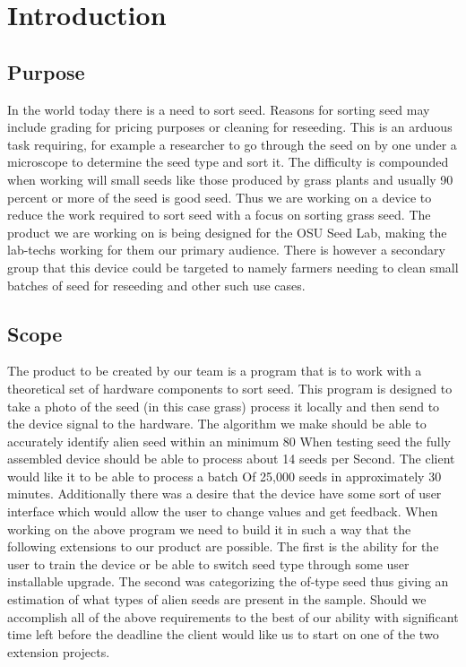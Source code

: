 \documentclass[onecolumn, draftclsnofoot,10pt, compsoc]{IEEEtran}
\begin{document}

\section{Introduction}

\subsection{Purpose}
In the world today there is a need to sort seed.
Reasons for sorting seed may include grading for pricing purposes or cleaning for reseeding.
This is an arduous task requiring, for example a researcher to go through the seed on by one under a microscope to determine the seed type and sort it.
The difficulty is compounded when working will small seeds like those produced by grass plants and usually 90 percent or more of the seed is good seed.
Thus we are working on a device to reduce the work required to sort seed with a focus on sorting grass seed.
The product we are working on is being designed for the OSU Seed Lab, making the lab-techs working for them our primary audience.
There is however a secondary group that this device could be targeted to namely farmers needing to clean small batches of seed for reseeding and other such use cases.

\subsection{Scope}
The product to be created by our team is a program that is to work with a theoretical set of hardware components to sort seed.
This program is designed to take a photo of the seed (in this case grass) process it locally and then send to the device signal to the hardware.
The algorithm we make should be able to accurately identify alien seed within an minimum 80%
When testing seed the fully assembled device should be able to process about 14 seeds per Second.
The client would like it to be able to process a batch Of 25,000 seeds in approximately 30 minutes.
Additionally there was a desire that the device have some sort of user interface which would allow the user to change values and get feedback.
When working on the above program we need to build it in such a way that the following extensions to our product are possible.
The first is the ability for the user to train the device or be able to switch seed type through some user installable upgrade.
The second was categorizing the of-type seed thus giving an estimation of what types of alien seeds are present in the sample.
Should we accomplish all of the above requirements to the best of our ability with significant time left before the deadline the client would like us to start on one of the two extension projects.
\end{document}
